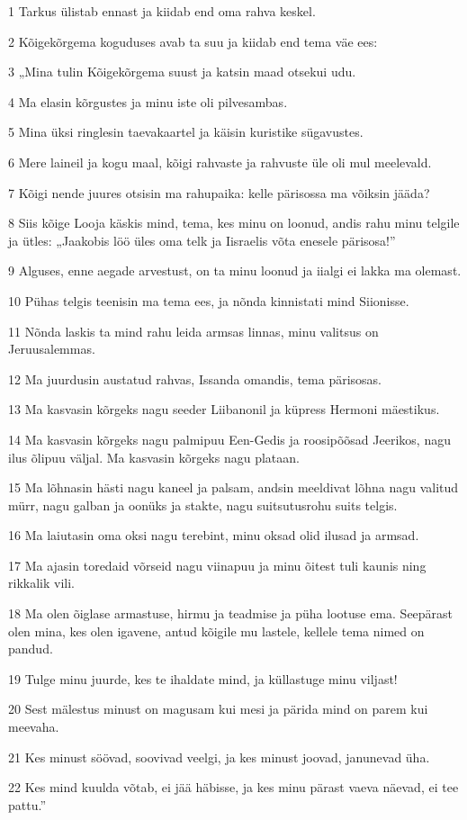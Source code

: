 \par 1 Tarkus ülistab ennast ja kiidab end oma rahva keskel.
\par 2 Kõigekõrgema koguduses avab ta suu ja kiidab end tema väe ees:
\par 3 „Mina tulin Kõigekõrgema suust ja katsin maad otsekui udu.
\par 4 Ma elasin kõrgustes ja minu iste oli pilvesambas.
\par 5 Mina üksi ringlesin taevakaartel ja käisin kuristike sügavustes.
\par 6 Mere laineil ja kogu maal, kõigi rahvaste ja rahvuste üle oli mul meelevald.
\par 7 Kõigi nende juures otsisin ma rahupaika: kelle pärisossa ma võiksin jääda?
\par 8 Siis kõige Looja käskis mind, tema, kes minu on loonud, andis rahu minu telgile ja ütles: „Jaakobis löö üles oma telk ja Iisraelis võta enesele pärisosa!”
\par 9 Alguses, enne aegade arvestust, on ta minu loonud ja iialgi ei lakka ma olemast.
\par 10 Pühas telgis teenisin ma tema ees, ja nõnda kinnistati mind Siionisse.
\par 11 Nõnda laskis ta mind rahu leida armsas linnas, minu valitsus on Jeruusalemmas.
\par 12 Ma juurdusin austatud rahvas, Issanda omandis, tema pärisosas.
\par 13 Ma kasvasin kõrgeks nagu seeder Liibanonil ja küpress Hermoni mäestikus.
\par 14 Ma kasvasin kõrgeks nagu palmipuu Een-Gedis ja roosipõõsad Jeerikos, nagu ilus õlipuu väljal. Ma kasvasin kõrgeks nagu plataan.
\par 15 Ma lõhnasin hästi nagu kaneel ja palsam, andsin meeldivat lõhna nagu valitud mürr, nagu galban ja oonüks ja stakte, nagu suitsutusrohu suits telgis.
\par 16 Ma laiutasin oma oksi nagu terebint, minu oksad olid ilusad ja armsad.
\par 17 Ma ajasin toredaid võrseid nagu viinapuu ja minu õitest tuli kaunis ning rikkalik vili.
\par 18 Ma olen õiglase armastuse, hirmu ja teadmise ja püha lootuse ema. Seepärast olen mina, kes olen igavene, antud kõigile mu lastele, kellele tema nimed on pandud.
\par 19 Tulge minu juurde, kes te ihaldate mind, ja küllastuge minu viljast!
\par 20 Sest mälestus minust on magusam kui mesi ja pärida mind on parem kui meevaha.
\par 21 Kes minust söövad, soovivad veelgi, ja kes minust joovad, janunevad üha.
\par 22 Kes mind kuulda võtab, ei jää häbisse, ja kes minu pärast vaeva näevad, ei tee pattu.”

